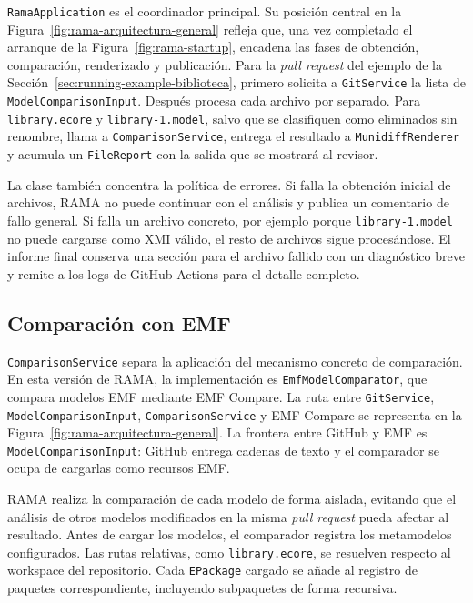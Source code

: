 \documentclass[11pt]{article}
\begin{document}
\texttt{RamaApplication} es el coordinador principal. Su posición central en la Figura~\ref{fig:rama-arquitectura-general} refleja que, una vez completado el arranque de la Figura~\ref{fig:rama-startup}, encadena las fases de obtención, comparación, renderizado y publicación. Para la \textit{pull request} del ejemplo de la Sección~\ref{sec:running-example-biblioteca}, primero solicita a \texttt{GitService} la lista de \texttt{ModelComparisonInput}. Después procesa cada archivo por separado. Para \texttt{library.ecore} y \texttt{library-1.model}, salvo que se clasifiquen como eliminados sin renombre, llama a \texttt{ComparisonService}, entrega el resultado a \texttt{MunidiffRenderer} y acumula un \texttt{FileReport} con la salida que se mostrará al revisor.

La clase también concentra la política de errores. Si falla la obtención inicial de archivos, RAMA no puede continuar con el análisis y publica un comentario de fallo general. Si falla un archivo concreto, por ejemplo porque \texttt{library-1.model} no puede cargarse como XMI válido, el resto de archivos sigue procesándose. El informe final conserva una sección para el archivo fallido con un diagnóstico breve y remite a los logs de GitHub Actions para el detalle completo.

\subsection{Comparación con EMF}

\texttt{ComparisonService} separa la aplicación del mecanismo concreto de comparación. En esta versión de RAMA, la implementación es \texttt{EmfModelComparator}, que compara modelos EMF mediante EMF Compare. La ruta entre \texttt{GitService}, \texttt{ModelComparisonInput}, \texttt{ComparisonService} y EMF Compare se representa en la Figura~\ref{fig:rama-arquitectura-general}. La frontera entre GitHub y EMF es \texttt{ModelComparisonInput}: GitHub entrega cadenas de texto y el comparador se ocupa de cargarlas como recursos EMF.

RAMA realiza la comparación de cada modelo de forma aislada, evitando que el análisis de otros modelos modificados en la misma \textit{pull request} pueda afectar al resultado. Antes de cargar los modelos, el comparador registra los metamodelos configurados. Las rutas relativas, como \texttt{library.ecore}, se resuelven respecto al workspace del repositorio. Cada \texttt{EPackage} cargado se añade al registro de paquetes correspondiente, incluyendo subpaquetes de forma recursiva.
\end{document}
